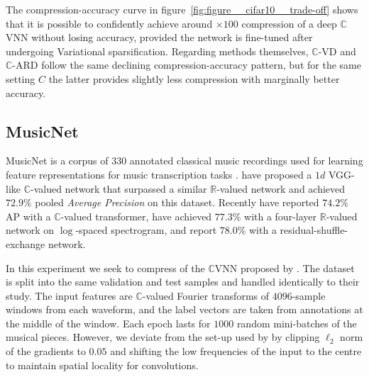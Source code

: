 \documentclass[a4paper,10pt,twocolumn]{article}
\newcommand{\real}{\mathbb{R}}
\newcommand{\cplx}{\mathbb{C}}
\begin{document}
The compression-accuracy curve in figure~\ref{fig:figure__cifar10__trade-off} shows that
it is possible to confidently achieve around $\times100$ compression of a deep $\cplx$VNN
without losing accuracy, provided the network is fine-tuned after undergoing Variational
sparsification. Regarding methods themselves, $\cplx$-VD and $\cplx$-ARD follow the same
declining compression-accuracy pattern, but for the same setting $C$ the latter provides
slightly less compression with marginally better accuracy.



\subsection{MusicNet} %
\label{sub:musicnet}



MusicNet is a corpus of $330$ annotated classical music recordings used for learning
feature representations for music transcription tasks \citep{thickstun_learning_2017}.
\citet{trabelsi_deep_2018} have proposed a $1d$ VGG-like $\cplx$-valued network that
surpassed a similar $\real$-valued network and achieved $72.9\%$ pooled \emph{Average
Precision} on this dataset. Recently \citet{yang_complex_2020} have reported $74.2\%$
AP with a $\cplx$-valued transformer, \citet{thickstun_invariances_2018} have achieved
$77.3\%$ with a four-layer $\real$-valued network on $\log$-spaced spectrogram, and
\citet{draguns_residual_2020} report $78.0\%$ with a residual-shuffle-exchange network.

In this experiment we seek to compress of the $\cplx$VNN proposed by \citet{trabelsi_deep_2018}.
%
The dataset is split into the same validation and test samples and handled identically
to their study. The input features are $\cplx$-valued Fourier transforms of $4096$-sample
windows from each waveform, and the label vectors are taken from annotations at the middle
of the window. Each epoch lasts for $1000$ random mini-batches of the musical pieces.
% 
However, we deviate from the set-up used by \citet{trabelsi_deep_2018} by clipping $\ell_2$
norm of the gradients to $0.05$ and shifting the low frequencies of the input to the centre
to maintain spatial locality for convolutions.
\end{document}
